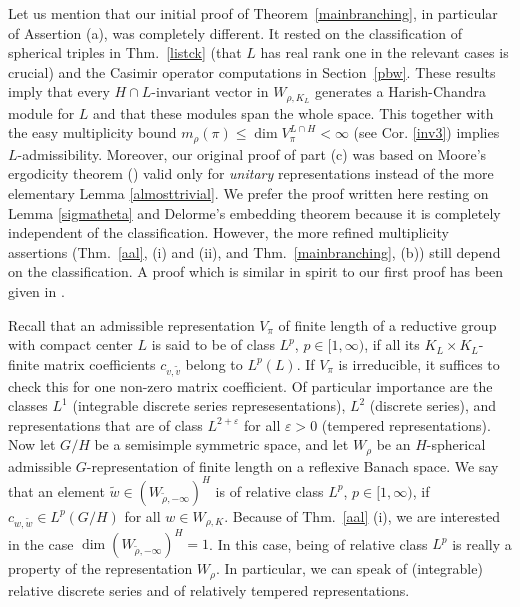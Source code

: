 \documentclass[10]{amsart}
\theoremstyle{remark}
\theoremstyle{definition}
\numberwithin{equation}{section}
\newcommand{\ve}{\varepsilon}
\begin{document}
{Let us mention that our initial proof of  Theorem~\ref{mainbranching}, in particular of Assertion (a),  was completely different.
It rested on the classification of spherical triples in Thm.~\ref{listck} (that $L$ has real rank one in the relevant cases is crucial) and the Casimir operator computations in 
Section~\ref{pbw}.
These results imply that every $H\cap L$-invariant vector in $W_{\rho,K_L}$  
generates a Harish-Chandra module for $L$ and that these modules span
the whole space. 
This together with the easy multiplicity bound $m_\rho(\pi)\le\dim V_\pi^{L\cap H}<\infty$ (see Cor. \ref{inv3}) implies $L$-admissibility.
Moreover, our original proof of part (c) was based on Moore's ergodicity theorem (\cite{Moo66}) valid only for {\em unitary} representations instead of the more elementary Lemma \ref{almosttrivial}. 
We prefer the proof written here resting on Lemma \ref{sigmatheta}
and Delorme's embedding theorem because it is completely independent of the classification. However, the more refined multiplicity assertions (Thm.~\ref{aal}, (i) and (ii), and Thm.~\ref{mainbranching}, (b))  still depend on the classification. A proof 
which is similar in spirit to our first proof has been given in \cite{KK25}.

Recall that an admissible representation $V_\pi$ of finite length of a reductive group with compact center $L$ is said to be of class $L^p$, $p\in [1,\infty)$, if all its 
$K_L\times K_L$-finite matrix coefficients $c_{v,\tilde v}$ belong to $L^p(L)$. If $V_\pi$ is irreducible, it suffices to check this for one non-zero matrix coefficient. 
Of particular importance are the classes 
$L^1$ (integrable discrete series represesentations), $L^2$ (discrete series), and representations that are of class $L^{2+\ve}$ for all $\ve>0$ (tempered representations).
Now let $G/H$ be a semisimple symmetric space, and let $W_\rho$ be an $H$-spherical admissible $G$-representation of finite length on a reflexive Banach space. 
We say that an element $\tilde w\in   ( W_{\tilde\rho,-\infty})^H$ is of relative class $L^p$,  $p\in [1,\infty)$, if $c_{w,\tilde w}\in L^p(G/H)$ for all $w\in W_{\rho,K}$.
Because of Thm.~\ref{aal} (i), we are interested in the case $\dim ( W_{\tilde\rho,-\infty})^H =1$. In this case, being of relative class $L^p$ is really a property of the representation
$W_\rho$. In particular, we can speak of (integrable) relative discrete series and of relatively tempered representations.

}
\end{document}
